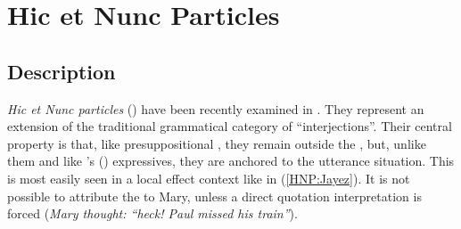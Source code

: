 \documentclass[output=paper,colorlinks,citecolor=brown]{langscibook}
\begin{document}



\section{Hic et Nunc Particles}

\label{sec-HN-particles:Jayez}

\subsection{Description}

\textit{Hic et Nunc particles} () have been recently examined in \citet{DargnatandJayez:2020,Dargnat:2024}. They represent an extension of the traditional grammatical category of ``interjections''. Their central property is that, like presuppositional , they remain outside the , but, unlike them and like \citeauthor{Potts:2007}'s (\citeyear{Potts:2007}) expressives, they are anchored to the utterance situation. This is most easily seen in a local effect context like in (\ref{HNP:Jayez}). It is not possible to attribute the  to Mary, unless a direct quotation interpretation is forced (\textit{Mary thought: ``heck! Paul missed his train''}).
\end{document}
